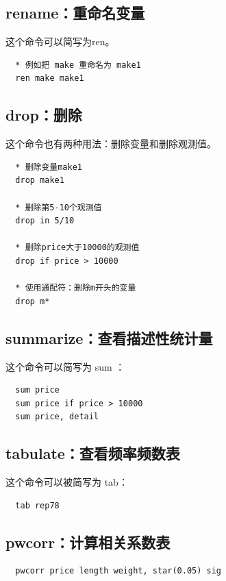 \documentclass[cn,fancy,blue,11pt]{elegantbook}
\begin{document}
\subsection{rename：重命名变量}

这个命令可以简写为ren。

\begin{lstlisting}
  * 例如把 make 重命名为 make1
  ren make make1
\end{lstlisting}

\subsection{drop：删除}

这个命令也有两种用法：删除变量和删除观测值。

\begin{lstlisting}
  * 删除变量make1
  drop make1

  * 删除第5-10个观测值
  drop in 5/10

  * 删除price大于10000的观测值
  drop if price > 10000

  * 使用通配符：删除m开头的变量
  drop m*
\end{lstlisting}

\subsection{summarize：查看描述性统计量}

这个命令可以简写为 sum ：

\begin{lstlisting}
  sum price
  sum price if price > 10000
  sum price, detail
\end{lstlisting}

\subsection{tabulate：查看频率频数表}

这个命令可以被简写为 tab：

\begin{lstlisting}
  tab rep78
\end{lstlisting}

\subsection{pwcorr：计算相关系数表}

\begin{lstlisting}
  pwcorr price length weight, star(0.05) sig
\end{lstlisting}
\end{document}
